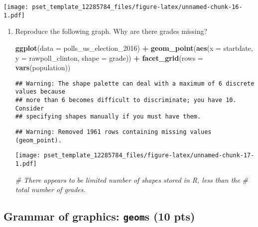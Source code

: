 \documentclass[
]{article}
\newenvironment{Shaded}{\begin{snugshade}}{\end{snugshade}}
\newcommand{\CommentTok}[1]{\textcolor[rgb]{0.56,0.35,0.01}{\textit{#1}}}
\newcommand{\DataTypeTok}[1]{\textcolor[rgb]{0.13,0.29,0.53}{#1}}
\newcommand{\DecValTok}[1]{\textcolor[rgb]{0.00,0.00,0.81}{#1}}
\newcommand{\KeywordTok}[1]{\textcolor[rgb]{0.13,0.29,0.53}{\textbf{#1}}}
\newcommand{\NormalTok}[1]{#1}
\newcommand{\OperatorTok}[1]{\textcolor[rgb]{0.81,0.36,0.00}{\textbf{#1}}}
\newcommand{\StringTok}[1]{\textcolor[rgb]{0.31,0.60,0.02}{#1}}
\begin{document}
\texttt{[image: pset\_template\_12285784\_files/figure-latex/unnamed-chunk-16-1.pdf]}

\begin{enumerate}
\def\labelenumi{\arabic{enumi}.}
\item
  Reproduce the following graph. Why are there grades missing?

\begin{Shaded}
\begin{Highlighting}[]
\KeywordTok{ggplot}\NormalTok{(}\DataTypeTok{data =}\NormalTok{ polls_us_election_}\DecValTok{2016}\NormalTok{) }\OperatorTok{+}
\StringTok{  }\KeywordTok{geom_point}\NormalTok{(}\KeywordTok{aes}\NormalTok{(}\DataTypeTok{x =}\NormalTok{ startdate, }
             \DataTypeTok{y =}\NormalTok{ rawpoll_clinton,}
             \DataTypeTok{shape =}\NormalTok{ grade)) }\OperatorTok{+}
\StringTok{  }\KeywordTok{facet_grid}\NormalTok{(}\DataTypeTok{rows =} \KeywordTok{vars}\NormalTok{(population))}
\end{Highlighting}
\end{Shaded}

\begin{verbatim}
## Warning: The shape palette can deal with a maximum of 6 discrete values because
## more than 6 becomes difficult to discriminate; you have 10. Consider
## specifying shapes manually if you must have them.
\end{verbatim}

\begin{verbatim}
## Warning: Removed 1961 rows containing missing values (geom_point).
\end{verbatim}

  \texttt{[image: pset\_template\_12285784\_files/figure-latex/unnamed-chunk-17-1.pdf]}

\begin{Shaded}
\begin{Highlighting}[]
\CommentTok{# There appears to be limited number of shapes stored in R, less than the }
\CommentTok{# total number of grades.}
\end{Highlighting}
\end{Shaded}
\end{enumerate}

\hypertarget{grammar-of-graphics-geoms-10-pts}{%
\subsection{\texorpdfstring{Grammar of graphics: \texttt{geom}s (10
pts)}{Grammar of graphics: geoms (10 pts)}}\label{grammar-of-graphics-geoms-10-pts}}
\end{document}
